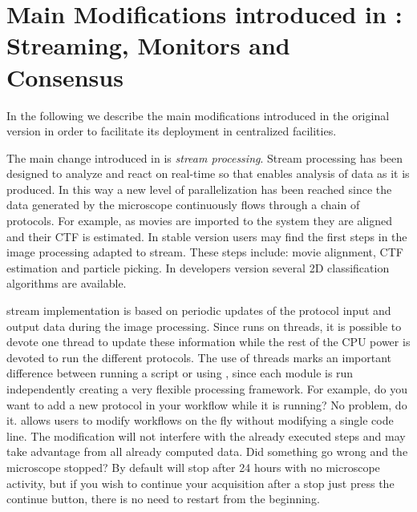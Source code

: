 \section{Main Modifications introduced in  \scipion: Streaming, Monitors and Consensus}
\label{overall}

In the following we describe the main modifications introduced in the original \scipion version in order to facilitate its deployment in centralized facilities. 

The main change introduced in \scipion is \emph{stream processing}. Stream processing has been designed to analyze and react on real-time so that enables analysis of data as it is produced.
In this way a new level of parallelization has been reached since the  data generated by the microscope continuously flows through a chain of protocols. For example, as movies are imported to the system they are aligned and their CTF is estimated. In \scipion stable version users may find  the first steps in the image processing adapted to stream. These steps include: movie alignment, CTF estimation and particle picking. In \scipion developers version  several 2D classification algorithms are available.

\scipion stream implementation is based on periodic updates of the protocol input and output data during the image processing. Since \scipion runs on threads, it is possible to devote one thread to update these information while the rest of the CPU power is devoted to run the different protocols. The use of threads marks an important difference between running a script or using \scipion, since  each module is run independently creating a very flexible processing framework. For example, do you want to add a new protocol in your workflow while it is running? No problem, do it. \scipion allows users to modify  workflows on the fly without modifying a single code line. The modification will not interfere with the already executed steps and may take advantage from all already computed data. Did something go wrong and the microscope stopped? By default \scipion will stop after 24 hours with no microscope activity, but if you wish to continue your acquisition after a stop just press the continue button, there is no need to restart from the beginning. 



